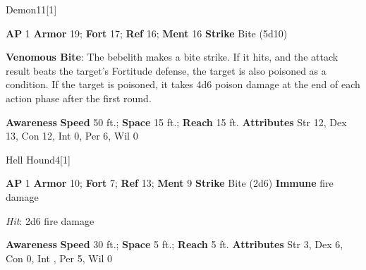 \begin{monsection}[Bebelith]{Demon}{11}[1]
\vspace{-1em}\vspace{-1em}
\begin{spellcontent}
\begin{spelltargetinginfo}
{\textbf{AP} 1}
\pari \textbf{Armor} 19;
\textbf{Fort} 17;
\textbf{Ref} 16;
\textbf{Ment} 16
\pari \textbf{Strike} Bite  (5d10)
\end{spelltargetinginfo}
\begin{spelleffects}
\pari
\textbf{Venomous Bite}:
The bebelith makes a bite strike.
If it hits, and the attack result beats the target's Fortitude defense, the target is also poisoned as a condition.
If the target is poisoned, it takes 4d6 poison damage at the end of each action phase after the first round.
\end{spelleffects}
\end{spellcontent}
\begin{spellsubcontent}
\begin{spellfooter}
\pari \textbf{Awareness} 
\pari \textbf{Speed} 50 ft.;
\textbf{Space} 15 ft.;
\textbf{Reach} 15 ft.
\pari \textbf{Attributes}
Str 12,
Dex 13,
Con 12,
Int 0,
Per 6,
Wil 0
\end{spellfooter}
\end{spellsubcontent}
\end{monsection}
\begin{monsection}{Hell Hound}{4}[1]
\vspace{-1em}\vspace{-1em}
\begin{spellcontent}
\begin{spelltargetinginfo}
{\textbf{AP} 1}
\pari \textbf{Armor} 10;
\textbf{Fort} 7;
\textbf{Ref} 13;
\textbf{Ment} 9
\pari \textbf{Strike} Bite  (2d6)
\pari \textbf{Immune} fire damage
\end{spelltargetinginfo}
\begin{spelleffects}
\pari
{}
\par
\par \textit{Hit}: 2d6 fire damage
\end{spelleffects}
\end{spellcontent}
\begin{spellsubcontent}
\begin{spellfooter}
\pari \textbf{Awareness} 
\pari \textbf{Speed} 30 ft.;
\textbf{Space} 5 ft.;
\textbf{Reach} 5 ft.
\pari \textbf{Attributes}
Str 3,
Dex 6,
Con 0,
Int ,
Per 5,
Wil 0
\end{spellfooter}
\end{spellsubcontent}
\end{monsection}
